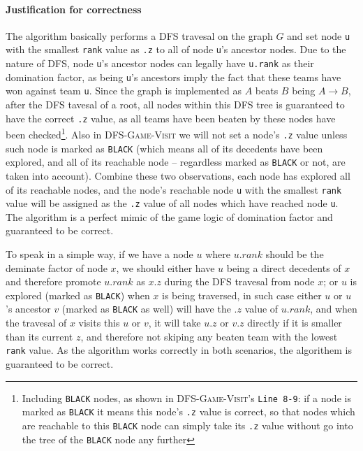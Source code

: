 \documentclass[11pt]{article}
\newcommand{\ilc}{\texttt}
\begin{document}
\paragraph{Justification for correctness} The algorithm basically performs a DFS travesal on the graph $G$ and set node \ilc{u} with the smallest \ilc{rank} value as \ilc{.z} to all of node \ilc{u}'s ancestor nodes. Due to the nature of DFS, node \ilc{u}'s ancestor nodes can legally have \ilc{u.rank} as their domination factor, as being \ilc{u}'s ancestors imply the fact that these teams have won against team \ilc{u}. Since the graph is implemented as $A$ beats $B$ being $A \rightarrow B$, after the DFS tavesal of a root, all nodes within this DFS tree is guaranteed to have the correct \ilc{.z} value, as all teams have been beaten by these nodes have been checked\footnote{Including \ilc{BLACK} nodes, as shown in \textsc{DFS-Game-Visit}'s \ilc{Line 8-9}: if a node is marked as \ilc{BLACK} it means this node's \ilc{.z} value is correct, so that nodes which are reachable to this \ilc{BLACK} node can simply take its \ilc{.z} value without go into the tree of the \ilc{BLACK} node any further}. \newline
Also in \textsc{DFS-Game-Visit} we will not set a node's \ilc{.z} value unless such node is marked as \ilc{BLACK} (which means all of its decedents have been explored, and all of its reachable node -- regardless marked as \ilc{BLACK} or not, are taken into account). Combine these two observations, each node has explored all of its reachable nodes, and the node's reachable node \ilc{u} with the smallest \ilc{rank} value will be assigned as the \ilc{.z} value of all nodes which have reached node \ilc{u}. The algorithm is a perfect mimic of the game logic of domination factor and guaranteed to be correct.\newline

To speak in a simple way, if we have a node $u$ where $u.rank$ should be the deminate factor of node $x$, we should either have $u$ being a direct decedents of $x$ and therefore promote $u.rank$ as $x.z$ during the DFS travesal from node $x$; or $u$ is explored (marked as \ilc{BLACK}) when $x$ is being traversed, in such case either $u$ or $u$'s ancestor $v$ (marked as \ilc{BLACK} as well) will have the $.z$ value of $u.rank$, and when the travesal of $x$ visits this $u$ or $v$, it will take $u.z$ or $v.z$ directly if it is smaller than its current $z$, and therefore not skiping any beaten team with the lowest \ilc{rank} value. As the algorithm works correctly in both scenarios, the algorithem is guaranteed to be correct.
\end{document}

